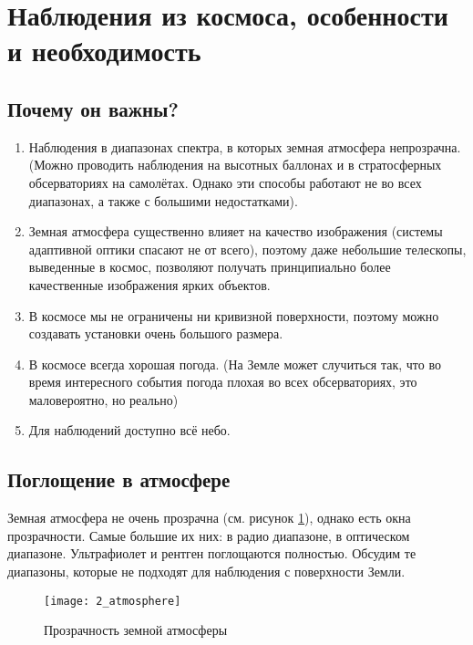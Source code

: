 \section{Наблюдения из космоса, особенности и необходимость}

\subsection{Почему он важны?}

\begin{enumerate}
	\item Наблюдения в диапазонах спектра, в которых земная атмосфера непрозрачна. (Можно проводить наблюдения на высотных баллонах и в стратосферных обсерваториях на самолётах. Однако эти способы работают не во всех диапазонах, а также с большими недостатками).
	
	\item Земная атмосфера существенно влияет на качество изображения (системы адаптивной оптики спасают не от всего), поэтому даже небольшие телескопы, выведенные в космос, позволяют получать принципиально более качественные изображения ярких объектов.
	
	\item В космосе мы не ограничены ни кривизной поверхности, поэтому можно создавать установки очень большого размера.
	
	\item В космосе всегда хорошая погода. (На Земле может случиться так, что во время интересного события погода плохая во всех обсерваториях, это маловероятно, но реально)
	
	\item Для наблюдений доступно всё небо.
\end{enumerate}

\subsection{Поглощение в атмосфере}

Земная атмосфера не очень прозрачна (см. рисунок \ref{fig:2_atmosphere}), однако есть окна прозрачности. Самые большие их них: в радио диапазоне, в оптическом диапазоне. Ультрафиолет и рентген поглощаются полностью. 
Обсудим те диапазоны, которые  не подходят для наблюдения с поверхности Земли.

\begin{figure}[H]
	\centering
	\texttt{[image: 2\_atmosphere]}
	\caption{Прозрачность земной атмосферы}
	\label{fig:2_atmosphere}
\end{figure}

